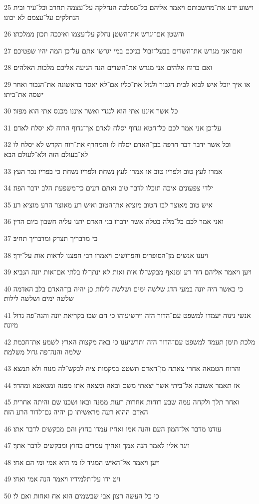 \par 25 וישוע ידע את־מחשבותם ויאמר אליהם כל־ממלכה הנחלקה על־עצמה תחרב וכל־עיר ובית הנחלקים על־עצמם לא יכונו׃
\par 26 והשטן אם־יגרש את־השטן נחלק על־עצמו ואיככה תכון ממלכתו׃
\par 27 ואם־אני מגרש את־השדים בבעל־זבול בניכם במי יגרשו אתם על־כן המה יהיו שפטיכם׃
\par 28 ואם ברוח אלהים אני מגרש את־השדים הנה הגיעה אליכם מלכות האלהים׃
\par 29 או איך יוכל איש לבוא לבית הגבור ולגזל את־כליו אם־לא יאסר בראשונה את־הגבור ואחר ישסה את־ביתו׃
\par 30 כל אשר איננו אתי הוא לנגדי ואשר איננו מכנס אתי הוא מפזר׃
\par 31 על־כן אני אמר לכם כל־חטא וגדוף יסלח לאדם אך־גדוף הרוח לא יסלח לאדם׃
\par 32 וכל אשר ידבר דבר חרפה בבן־האדם יסלח לו והמחרף את־רוח הקדש לא יסלח לו לא־בעולם הזה ולא־לעולם הבא׃
\par 33 אמרו לעץ טוב ולפריו טוב או אמרו לעץ נשחת ולפריו נשחת כי בפריו נכר העץ׃
\par 34 ילדי צפעונים איכה תוכלו לדבר טוב ואתם רעים כי־משפעת הלב ידבר הפה׃
\par 35 איש טוב מאוצר לבו הטוב מוציא את־הטוב ואיש רע מאוצר הרע מוציא רע׃
\par 36 ואני אמר לכם כל־מלה בטלה אשר ידברו בני האדם יתנו עליה חשבון ביום הדין׃
\par 37 כי מדבריך תצדק ומדבריך תחיב׃
\par 38 ויענו אנשים מן־הסופרים והפרושים ויאמרו רבי חפצנו לראות אות על־ידך׃
\par 39 ויען ויאמר אליהם דור רע ומנאף מבקש־לו אות ואות לא ינתן־לו בלתי אם־אות יונה הנביא׃
\par 40 כי כאשר היה יונה במעי הדג שלשה ימים ושלשה לילות כן יהיה בן־האדם בלב האדמה שלשה ימים ושלשה לילות׃
\par 41 אנשי נינוה יעמדו למשפט עם־הדור הזה וירשיעוהו כי הם שבו בקריאת יונה והנה־פה גדול מיונה׃
\par 42 מלכת תימן תעמד למשפט עם־הדור הזה ותרשיענו כי באה מקצות הארץ לשמע את־חכמת שלמה והנה־פה גדול משלמה׃
\par 43 והרוח הטמאה אחרי צאתה מן־האדם תשטט במקמות ציה לבקש־לה מנוח ולא תמצא׃
\par 44 אז תאמר אשובה אל־ביתי אשר יצאתי משם ובאה ומצאה אתו מפנה ומטאטא ומהדר׃
\par 45 ואחר תלך ולקחה עמה שבע רוחות אחרות רעות ממנה ובאו ושכנו שם והיתה אחרית האדם ההוא רעה מראשיתו כן יהיה גם־לדור הרע הזה׃
\par 46 עודנו מדבר אל־המון העם והנה אמו ואחיו עמדו בחוץ והם מבקשים לדבר אתו׃
\par 47 ויגד אליו לאמר הנה אמך ואחיך עמדים בחוץ ומבקשים לדבר אתך׃
\par 48 ויען ויאמר אל־האיש המגיד לו מי היא אמי ומי הם אחי׃
\par 49 ויט ידו על־תלמידיו ויאמר הנה אמי ואחי׃
\par 50 כי כל העשה רצון אבי שבשמים הוא אח ואחות ואם לי׃

